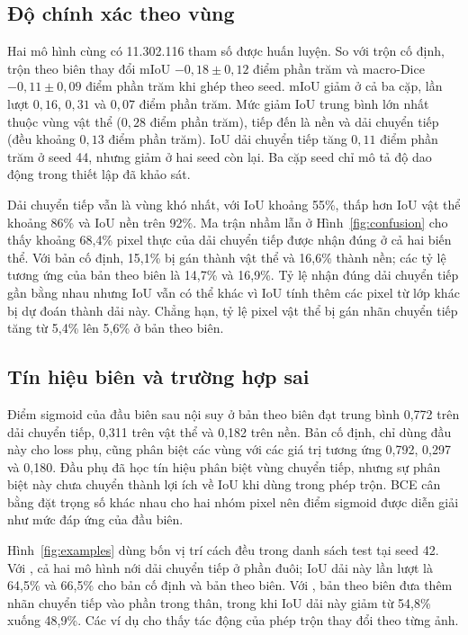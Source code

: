 \subsection{Độ chính xác theo vùng}

Hai mô hình cùng có 11.302.116 tham số được huấn luyện. So với trộn cố định, trộn theo biên thay đổi mIoU $-0{,}18\pm0{,}12$ điểm phần trăm và macro-Dice $-0{,}11\pm0{,}09$ điểm phần trăm khi ghép theo seed. mIoU giảm ở cả ba cặp, lần lượt $0{,}16$, $0{,}31$ và $0{,}07$ điểm phần trăm. Mức giảm IoU trung bình lớn nhất thuộc vùng vật thể ($0{,}28$ điểm phần trăm), tiếp đến là nền và dải chuyển tiếp (đều khoảng $0{,}13$ điểm phần trăm). IoU dải chuyển tiếp tăng $0{,}11$ điểm phần trăm ở seed 44, nhưng giảm ở hai seed còn lại. Ba cặp seed chỉ mô tả độ dao động trong thiết lập đã khảo sát.

Dải chuyển tiếp vẫn là vùng khó nhất, với IoU khoảng 55\%, thấp hơn IoU vật thể khoảng 86\% và IoU nền trên 92\%. Ma trận nhầm lẫn ở Hình~\ref{fig:confusion} cho thấy khoảng 68,4\% pixel thực của dải chuyển tiếp được nhận đúng ở cả hai biến thể. Với bản cố định, 15,1\% bị gán thành vật thể và 16,6\% thành nền; các tỷ lệ tương ứng của bản theo biên là 14,7\% và 16,9\%. Tỷ lệ nhận đúng dải chuyển tiếp gần bằng nhau nhưng IoU vẫn có thể khác vì IoU tính thêm các pixel từ lớp khác bị dự đoán thành dải này. Chẳng hạn, tỷ lệ pixel vật thể bị gán nhãn chuyển tiếp tăng từ 5,4\% lên 5,6\% ở bản theo biên.

\subsection{Tín hiệu biên và trường hợp sai}

Điểm sigmoid của đầu biên sau nội suy ở bản theo biên đạt trung bình 0,772 trên dải chuyển tiếp, 0,311 trên vật thể và 0,182 trên nền. Bản cố định, chỉ dùng đầu này cho loss phụ, cũng phân biệt các vùng với các giá trị tương ứng 0,792, 0,297 và 0,180. Đầu phụ đã học tín hiệu phân biệt vùng chuyển tiếp, nhưng sự phân biệt này chưa chuyển thành lợi ích về IoU khi dùng trong phép trộn. BCE cân bằng đặt trọng số khác nhau cho hai nhóm pixel nên điểm sigmoid được diễn giải như mức đáp ứng của đầu biên.

Hình~\ref{fig:examples} dùng bốn vị trí cách đều trong danh sách test tại seed 42. Với , cả hai mô hình nới dải chuyển tiếp ở phần đuôi; IoU dải này lần lượt là 64,5\% và 66,5\% cho bản cố định và bản theo biên. Với , bản theo biên đưa thêm nhãn chuyển tiếp vào phần trong thân, trong khi IoU dải này giảm từ 54,8\% xuống 48,9\%. Các ví dụ cho thấy tác động của phép trộn thay đổi theo từng ảnh.

